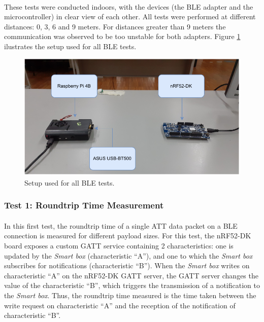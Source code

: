 \paragraph{} These tests were conducted indoors, with the devices (the \acs{BLE} adapter and the microcontroller) in clear view of each other. All tests were performed at different distances: 0, 3, 6 and 9 meters. For distances greater than 9 meters the communication was observed to be too unstable for both adapters. Figure \ref{fig:ble-test-setup} ilustrates the setup used for all \acs{BLE} tests.

\begin{figure}[H]
    \centering
    \includegraphics[width=0.75\linewidth]{images/ble test setup.pdf}
    \caption{Setup used for all \acs{BLE} tests.}
    \label{fig:ble-test-setup}
\end{figure}

\subsubsection{Test 1: Roundtrip Time Measurement}

\paragraph{} In this first test, the roundtrip time of a single \acs{ATT} data packet on a \acs{BLE} connection is measured for different payload sizes. For this test, the nRF52-DK board exposes a custom \acs{GATT} service containing 2 characteristics: one is updated by the \textit{Smart box} (characteristic ``A''), and one to which the \textit{Smart box} subscribes for notifications (characteristic ``B''). When the \textit{Smart box} writes on characteristic ``A'' on the nRF52-DK \acs{GATT} server, the \acs{GATT} server changes the value of the characteristic ``B'', which triggers the transmission of a notification to the \textit{Smart box}. Thus, the roundtrip time measured is the time taken between the write request on characteristic ``A'' and the reception of the notification of characteristic ``B''. 

